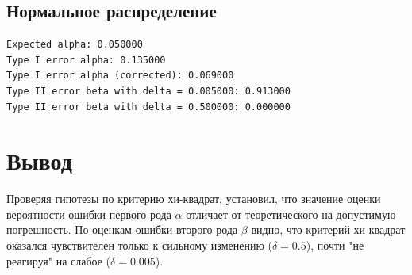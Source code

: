 \documentclass{article}
\begin{document}
        \subsection{Нормальное распределение}
\begin{verbatim}
Expected alpha: 0.050000
Type I error alpha: 0.135000
Type I error alpha (corrected): 0.069000
Type II error beta with delta = 0.005000: 0.913000
Type II error beta with delta = 0.500000: 0.000000
\end{verbatim}
            \newpage
            \begin{figure}[h]
        	\end{figure}                	
    \section{Вывод}
        Проверяя гипотезы по критерию хи-квадрат, установил, что значение оценки вероятности ошибки первого рода $\alpha$ отличает от теоретического на допустимую погрешность. По оценкам ошибки второго рода $\beta$ видно, что критерий хи-квадрат оказался чувствителен только к сильному изменению ($\delta = 0.5$), почти "не реагируя" на слабое ($\delta = 0.005$).
\end{document}
